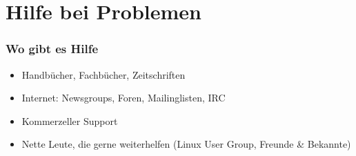 \documentclass[compress]{beamer}
\begin{document}
\section{Hilfe bei Problemen}
\begin{frame}
	\frametitle{Wo gibt es Hilfe}
	\begin{itemize}
		\item Handbücher, Fachbücher, Zeitschriften
		\item Internet: Newsgroups, Foren, Mailinglisten, IRC
		\item Kommerzeller Support
		\item Nette Leute, die gerne weiterhelfen (Linux User Group, Freunde \& Bekannte)
	\end{itemize}
\end{frame}
\end{document}

